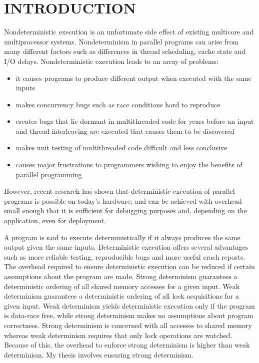 \chapter{INTRODUCTION}

Nondeterministic execution is an unfortunate side effect of existing
multicore and multiprocessor systems.  Nondeterminism in parallel
programs can arise from many different factors such as differences in
thread scheduling, cache state and I/O delays.  Nondeterministic
execution leads to an array of problems:

\begin{itemize}
\item it causes programs to produce different output when executed
  with the same inputs

\item makes concurrency bugs such as race conditions hard to reproduce

\item creates bugs that lie dormant in multithreaded code for years
  before an input and thread interleaving are executed that causes
  them to be discovered

\item makes unit testing of multithreaded code difficult and less
  conclusive

\item causes major frustrations to programmers wishing to enjoy the
  benefits of parallel programming
\end{itemize}

However, recent research has shown that deterministic execution of
parallel programs is possible on today's hardware, and can be achieved
with overhead small enough that it is sufficient for debugging
purposes and, depending on the application, even for deployment.

A program is said to execute deterministically if it always produces
the same output given the same inputs.  Deterministic execution offers
several advantages such as more reliable testing, reproducible bugs
and more useful crash reports.  The overhead required to ensure
deterministic execution can be reduced if certain assumptions about
the program are made.  Strong determinism guarantees a deterministic
ordering of all shared memory accesses for a given input.  Weak
determinism guarantees a deterministic ordering of all lock
acquisitions for a given input.  Weak determinism yields deterministic
execution only if the program is data-race free, while strong
determinism makes no assumptions about program correctness.  Strong
determinism is concerned with all accesses to shared memory whereas
weak determinism requires that only lock operations are watched.
Because of this, the overhead to enforce strong determinism is higher
than weak determinism.  My thesis involves ensuring strong
determinism.

